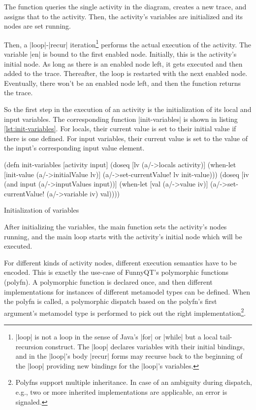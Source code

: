 \documentclass[submission]{eptcs}
\newcommand{\code}{\clojureinline}
\begin{document}
The function queries the single activity in the diagram, creates a new trace,
and assigns that to the activity.  Then, the activity's variables are
initialized and its nodes are set running.

Then, a \code|loop|-\code|recur| iteration\footnote{\code|loop| is not a loop
  in the sense of Java's \code|for| or \code|while| but a local tail-recursion
  construct.  The \code|loop| declares variables with their initial bindings,
  and in the \code|loop|'s body \code|recur| forms may recurse back to the
  beginning of the \code|loop| providing new bindings for the \code|loop|'s
  variables.} performs the actual execution of the activity.  The variable
\code|en| is bound to the first enabled node.  Initially, this is the
activity's initial node.  As long as there is an enabled node left, it gets
executed and then added to the trace.  Thereafter, the loop is restarted with
the next enabled node.  Eventually, there won't be an enabled node left, and
then the function returns the trace.

So the first step in the execution of an activity is the initialization of its
local and input variables.  The corresponding function \code|init-variables| is
shown in listing \vref{lst:init-variables}.  For locals, their current value is
set to their initial value if there is one defined.  For input variables, their
current value is set to the value of the input's corresponding input value
element.

\begin{listing}[h!tb]
\begin{clojurecode}
(defn init-variables [activity input]
  (doseq [lv (a/->locals activity)]
    (when-let [init-value (a/->initialValue lv)]
      (a/->set-currentValue! lv init-value)))
  (doseq [iv (and input (a/->inputValues input))]
    (when-let [val (a/->value iv)]
      (a/->set-currentValue! (a/->variable iv) val))))
\end{clojurecode}
\caption{Initialization of variables}
\label{lst:init-variables}
\end{listing}

After initializing the variables, the main function sets the activity's nodes
running, and the main loop starts with the activity's initial node which will
be executed.

For different kinds of activity nodes, different execution semantics have to be
encoded.  This is exactly the use-case of FunnyQT's polymorphic functions
(polyfn).  A polymorphic function is declared once, and then different
implementations for instances of different metamodel types can be defined.
When the polyfn is called, a polymorphic dispatch based on the polyfn's first
argument's metamodel type is performed to pick out the right
implementation\footnote{Polyfns support multiple inheritance.  In case of an
  ambiguity during dispatch, e.g., two or more inherited implementations are
  applicable, an error is signaled.}.
\end{document}
